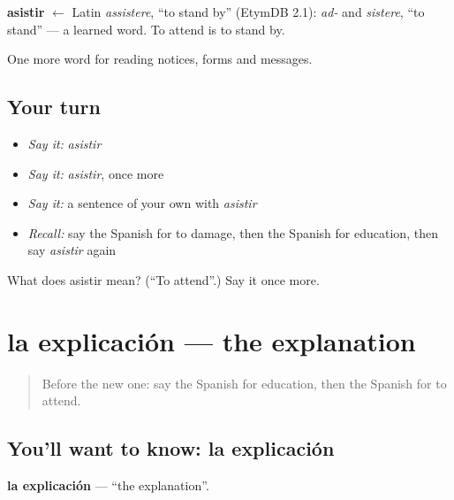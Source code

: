 \begin{cousinweb}
\textbf{asistir} $\leftarrow$ Latin \emph{assistere}, \textquotedblleft{}to stand by\textquotedblright{} (EtymDB 2.1): \emph{ad-} and \emph{sistere}, \textquotedblleft{}to stand\textquotedblright{} — a learned word. To attend is to stand by.
\end{cousinweb}

\begin{grammarlens}[title={What you've built}]
One more word for reading notices, forms and messages.
\end{grammarlens}

\subsection*{Your turn}
\begin{itemize}
\raggedright
  \item \emph{Say it:} \emph{asistir}
  \item \emph{Say it:} \emph{asistir}, once more
  \item \emph{Say it:} a sentence of your own with \emph{asistir}
  \item \emph{Recall:} say the Spanish for to damage, then the Spanish for education, then say \emph{asistir} again
\end{itemize}

\begin{tcolorbox}[breakable,colback=teal!4,colframe=teal!35!black,title={Before you move on}]
What does asistir mean? (\textquotedblleft{}To attend\textquotedblright{}.) Say it once more.
\end{tcolorbox}
\section[la explicación]{la explicación — the explanation}

\label{lesson:ES-C505-explicacion}



\begin{quote}
Before the new one: say the Spanish for education, then the Spanish for to attend.
\end{quote}

\subsection*{You'll want to know: la explicación}
\textbf{la explicación} — \textquotedblleft{}the explanation\textquotedblright{}.

